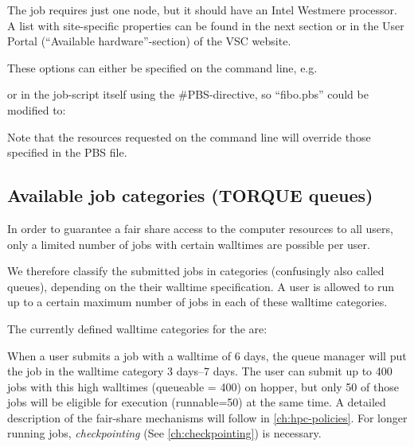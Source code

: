 \begin{prompt}
\end{prompt}

The job requires just one node, but it should have an Intel Westmere processor.
A list with site-specific properties can be found in the next section or in the 
User Portal (``Available hardware''-section) of the VSC website.

These options can either be specified on the command line, e.g.

\begin{prompt}
\end{prompt}

or in the job-script itself using the \#PBS-directive, so ``fibo.pbs'' could be modified to:


Note that the resources requested on the command line will override those
specified in the PBS file.

\subsection{Available job categories (TORQUE queues)}

In order to guarantee a fair share access to the computer resources to all
users, only a limited number of jobs with certain walltimes are possible per
user.

We therefore classify the submitted jobs in categories (confusingly also called
queues), depending on the their walltime specification.  A user is allowed to
run up to a certain maximum number of jobs in each of these walltime
categories.

The currently defined walltime categories for the \hpc
are:



\ifantwerpen
When a user submits a job with a walltime of 6 days, the queue manager will
put the job in the walltime category 3 days--7 days.  The user can submit up to 400 jobs with
this high walltimes (queueable = 400) on hopper, but only 50 of those jobs will be eligible
for execution (runnable=50) at the same time.  A detailed description of the
fair-share mechanisms will follow in \autoref{ch:hpc-policies}. For longer running jobs,
\emph{checkpointing} (See \autoref{ch:checkpointing}) is necessary.
\fi

